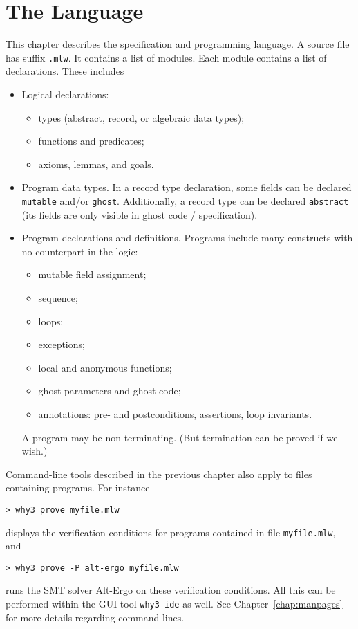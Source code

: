\chapter{The \whyml Language}
\label{chap:whyml}

This chapter describes the \whyml specification and programming
language.  A \whyml source file has suffix \texttt{.mlw}. It contains
a list of modules. Each module contains a list of
declarations. These includes
\begin{itemize}
\item
  Logical declarations:
  \begin{itemize}
  \item types (abstract, record, or algebraic data types);
  \item functions and predicates;
  \item axioms, lemmas, and goals.
  \end{itemize}
\item
  Program data types.
  In a record type declaration, some fields can be declared
  \texttt{mutable} and/or \texttt{ghost}.
  Additionally, a record type can be declared \texttt{abstract} (its
  fields are only visible in ghost code / specification).
\item
  Program declarations and definitions.
  Programs include many constructs with no counterpart in the logic:
  \begin{itemize}
  \item mutable field assignment;
  \item sequence;
  \item loops;
  \item exceptions;
  \item local and anonymous functions;
  \item ghost parameters and ghost code;
  \item annotations: pre- and postconditions, assertions, loop invariants.
  \end{itemize}
  A program may be non-terminating. (But termination can be
  proved if we wish.)
\end{itemize}
%
Command-line tools described in the previous chapter also apply to
files containing programs. For instance
\begin{verbatim}
> why3 prove myfile.mlw
\end{verbatim}
displays the verification conditions for programs contained in
file \texttt{myfile.mlw}, and
\begin{verbatim}
> why3 prove -P alt-ergo myfile.mlw
\end{verbatim}
runs the SMT solver Alt-Ergo on these verification conditions.
All this can be performed within the GUI tool \texttt{why3 ide} as well.
See Chapter~\ref{chap:manpages} for more details regarding command lines.

